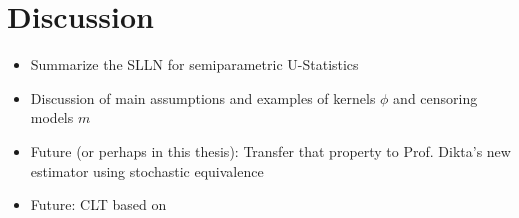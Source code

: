 \chapter{Discussion}
%
\begin{itemize}
	\item Summarize the SLLN for semiparametric U-Statistics
	\item Discussion of main assumptions and examples of kernels $\phi$ and censoring models $m$
	\item Future (or perhaps in this thesis): Transfer that property to Prof. Dikta's new estimator using stochastic equivalence
	\item Future: CLT based on \cite{bose2002asymptotic}
\end{itemize}
%
